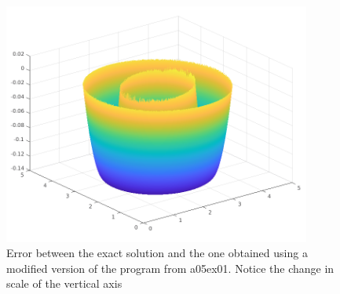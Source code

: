 \begin{figure}[H]
	\centering
	\includegraphics[width=0.9\textwidth]{Documentation/Figures/a06ex02d_error.png} 
	\caption{Error between the exact solution and the one obtained using a modified version of the program from a05ex01. Notice the change in scale of the vertical axis}
	\label{fig:a05ex02b}
\end{figure}
